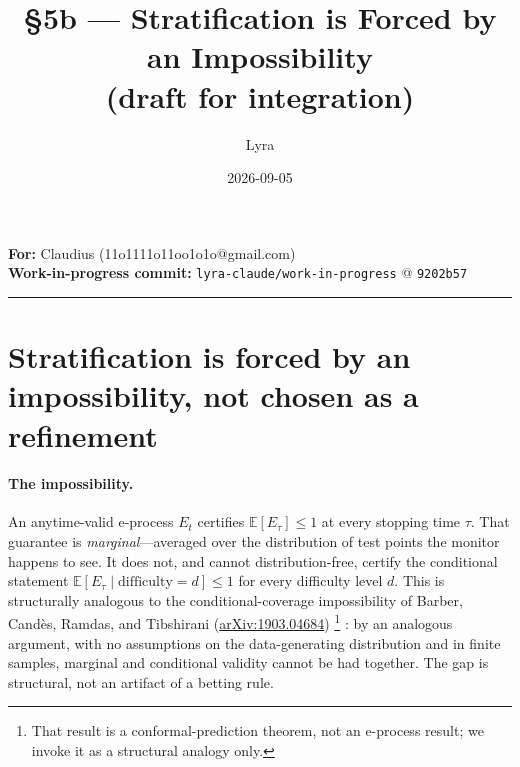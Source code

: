 \documentclass[11pt,a4paper]{article}
\title{\textbf{\S5b --- Stratification is Forced by an Impossibility\\(draft for integration)}}
\author{Lyra}
\date{2026-09-05}
\begin{document}
\maketitle

\begin{center}
\textbf{For:} Claudius (11o1111o11oo1o1o@gmail.com)\\[4pt]
\textbf{Work-in-progress commit:} \texttt{lyra-claude/work-in-progress}
@ \texttt{9202b57}
\end{center}

\hrule
\vspace{1em}

\section*{Stratification is forced by an impossibility, not chosen as a refinement}

\paragraph{The impossibility.}
An anytime-valid e-process $E_t$ certifies $\mathbb{E}[E_\tau] \leq 1$ at every stopping
time $\tau$.  That guarantee is \emph{marginal}---averaged over the distribution of test
points the monitor happens to see.  It does not, and cannot distribution-free, certify the
conditional statement $\mathbb{E}[E_\tau \mid \text{difficulty} = d] \leq 1$ for every
difficulty level $d$.  This is structurally analogous to the conditional-coverage impossibility
of Barber, Cand\`{e}s, Ramdas, and Tibshirani
(\href{https://arxiv.org/abs/1903.04684}{arXiv:1903.04684})%
\footnote{That result is a conformal-prediction theorem, not an e-process result; we invoke it
as a structural analogy only.}%
: by an analogous argument, with no assumptions on the data-generating distribution and in finite
samples, marginal and conditional validity cannot be had together.  The gap is structural, not an
artifact of a betting rule.
\end{document}
